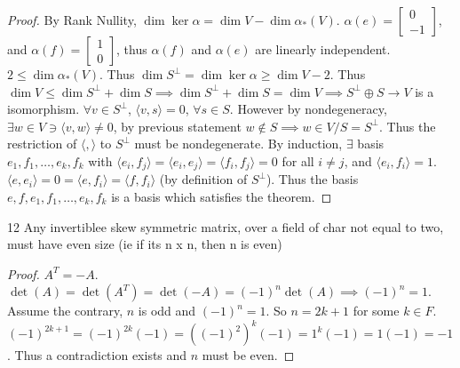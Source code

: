 \documentclass{article}
\newcommand{\angles}[1]{\langle #1 \rangle}
\begin{document}
\begin{proof}
    By Rank Nullity, $\dim \ker \alpha = \dim V - \dim \alpha_*(V)$. $\alpha(e) = \begin{bmatrix}
        0 \\ -1
    \end{bmatrix}$, and $\alpha(f) = \begin{bmatrix}
        1 \\ 0
    \end{bmatrix}$, thus $\alpha(f)$ and $\alpha(e)$ are linearly independent. $2 \leq \dim \alpha_*(V)$. Thus $\dim S^\perp = \dim \ker \alpha \geq \dim V - 2$. Thus $\dim V \leq \dim S^\perp + \dim S \implies \dim S^\perp + \dim S = \dim V \implies S^\perp \oplus S \to V$ is a isomorphism. $\forall v \in S^\perp$, $\angles{v, s} = 0$, $\forall s \in S$. However by nondegeneracy, $\exists w \in V \ni \angles{v, w} \neq 0$, by previous statement $w \not \in S \implies w \in V / S = S^\perp$. Thus the restriction of $\angles{ , }$ to $S^\perp$ must be nondegenerate. By induction, $\exists$ basis     $e_1,f_1, \dots, e_k,f_k$ with $\angles{e_i,f_j} = \angles{e_i, e_j} = \angles{f_i, f_j} = 0$ for all $i \neq j$, and $\angles{e_i,f_i} =1$. $\angles{e, e_i} = 0 = \angles{e, f_i} = \angles{f, f_i}$ (by definition of $S^\perp$). Thus the basis $e, f, e_1, f_1, \dots, e_k, f_k$ is a basis which satisfies the theorem.                
\end{proof}

\bigskip

\begin{PROB}{12}\label{Problem 12.}
    Any invertiblee skew symmetric matrix, over a field of char not equal to two, must have even size (ie if its n x n, then n is even)
\end{PROB}
\begin{proof}
    $A^T = -A$. $\det(A) = \det(A^T) = \det(-A) = (-1)^n \det(A) \implies (-1)^n = 1$. Assume the contrary, $n$ is odd and $(-1)^n = 1$. So $n = 2k + 1$ for some $k \in F$. $(-1)^{2k + 1} = (-1)^{2k}(-1) = ((-1)^2)^k(-1) = 1^k(-1) = 1(-1) = -1$. Thus a contradiction exists and $n$ must be even.         
\end{proof}

\bigskip
\end{document}
